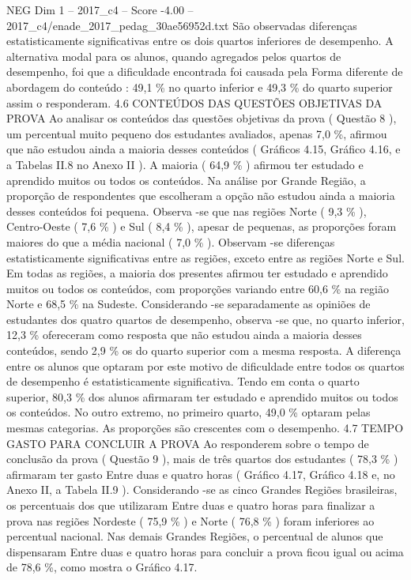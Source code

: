 \begin{textsample}{NEG Dim 1 – 2017\_c4 – Score -4.00 – 2017\_c4/enade\_2017\_pedag\_30ae56952d.txt}
São observadas diferenças estatisticamente significativas entre os dois quartos inferiores de desempenho.
A alternativa modal para os alunos, quando agregados pelos quartos de desempenho, foi que a dificuldade encontrada foi causada pela Forma diferente de abordagem do conteúdo : 49,1 \% no quarto inferior e 49,3 \% do quarto superior assim o responderam. 4.6 CONTEÚDOS DAS QUESTÕES OBJETIVAS DA PROVA Ao analisar os conteúdos das questões objetivas da prova ( Questão 8 ), um percentual muito pequeno dos estudantes avaliados, apenas 7,0 \%, afirmou que não estudou ainda a maioria desses conteúdos ( Gráficos 4.15, Gráfico 4.16, e a Tabelas II.8 no Anexo II ).
A maioria ( 64,9 \% ) afirmou ter estudado e aprendido muitos ou todos os conteúdos.
Na análise por Grande Região, a proporção de respondentes que escolheram a opção não estudou ainda a maioria desses conteúdos foi pequena.
Observa -se que nas regiões Norte ( 9,3 \% ), Centro-Oeste ( 7,6 \% ) e Sul ( 8,4 \% ), apesar de pequenas, as proporções foram maiores do que a média nacional ( 7,0 \% ).
Observam -se diferenças estatisticamente significativas entre as regiões, exceto entre as regiões Norte e Sul.
Em todas as regiões, a maioria dos presentes afirmou ter estudado e aprendido muitos ou todos os conteúdos, com proporções variando entre 60,6 \% na região Norte e 68,5 \% na Sudeste.
Considerando -se separadamente as opiniões de estudantes dos quatro quartos de desempenho, observa -se que, no quarto inferior, 12,3 \% ofereceram como resposta que não estudou ainda a maioria desses conteúdos, sendo 2,9 \% os do quarto superior com a mesma resposta.
A diferença entre os alunos que optaram por este motivo de dificuldade entre todos os quartos de desempenho é estatisticamente significativa.
Tendo em conta o quarto superior, 80,3 \% dos alunos afirmaram ter estudado e aprendido muitos ou todos os conteúdos.
No outro extremo, no primeiro quarto, 49,0 \% optaram pelas mesmas categorias.
As proporções são crescentes com o desempenho. 4.7 TEMPO GASTO PARA CONCLUIR A PROVA Ao responderem sobre o tempo de conclusão da prova ( Questão 9 ), mais de três quartos dos estudantes ( 78,3 \% ) afirmaram ter gasto Entre duas e quatro horas ( Gráfico 4.17, Gráfico 4.18 e, no Anexo II, a Tabela II.9 ).
Considerando -se as cinco Grandes Regiões brasileiras, os percentuais dos que utilizaram Entre duas e quatro horas para finalizar a prova nas regiões Nordeste ( 75,9 \% ) e Norte ( 76,8 \% ) foram inferiores ao percentual nacional.
Nas demais Grandes Regiões, o percentual de alunos que dispensaram Entre duas e quatro horas para concluir a prova ficou igual ou acima de 78,6 \%, como mostra o Gráfico 4.17.

\end{textsample}

